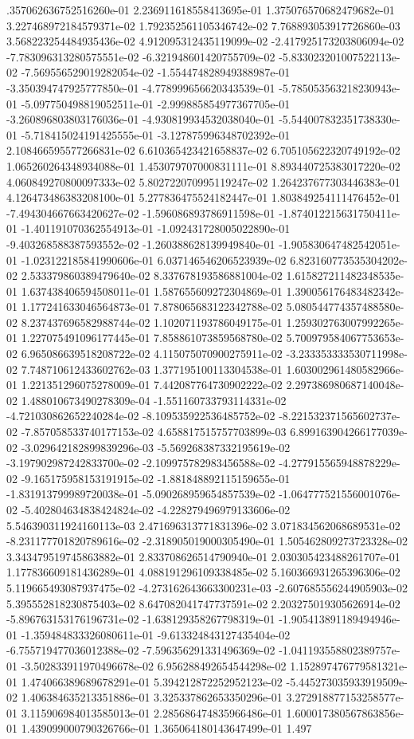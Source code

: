 .357062636752516260e-01	2.236911618558413695e-01	1.375076570682479682e-01	3.227468972184579371e-02	1.792352561105346742e-02	7.768893053917726860e-03	3.568223254484935436e-02	4.912095312435119099e-02	-2.417925173203806094e-02	-7.783096313280575551e-02	-6.321948601420755709e-02	-5.833023201007522113e-02	-7.569556529019282054e-02	-1.554474828949388987e-01	-3.350394747925777850e-01	-4.778999656620343539e-01	-5.785053563218230943e-01	-5.097750498819052511e-01	-2.999885854977367705e-01	-3.260896803803176036e-01	-4.930819934532038040e-01	-5.544007832351738330e-01	-5.718415024191425555e-01	-3.127875996348702392e-01	2.108466595577266831e-02	6.610365423421658837e-02	6.705105622320749192e-02	1.065260264348934088e-01	1.453079707000831111e-01	8.893440725383017220e-02	4.060849270800097333e-02	5.802722070995119247e-02	1.264237677303446383e-01	4.126473486383208100e-01	5.277836475524182447e-01	1.803849254111476452e-01	-7.494304667663420627e-02	-1.596086893786911598e-01	-1.874012215631750411e-01	-1.401191070362554913e-01	-1.092431728005022890e-01	-9.403268588387593552e-02	-1.260388628139949840e-01	-1.905830647482542051e-01	-1.023122185841990606e-01	6.037146546206523939e-02	6.823160773535304202e-02	2.533379860389479640e-02	8.337678193586881004e-02	1.615827211482348535e-01	1.637438406594508011e-01	1.587655609272304869e-01	1.390056176483482342e-01	1.177241633046564873e-01	7.878065683122342788e-02	5.080544774357488580e-02	8.237437696582988744e-02	1.102071193786049175e-01	1.259302763007992265e-01	1.227075491096177445e-01	7.858861073859568780e-02	5.700979584067753653e-02	6.965086639518208722e-02	4.115075070900275911e-02	-3.233353333530711998e-02	7.748710612433602762e-03	1.377195100113304538e-01	1.603002961480582966e-01	1.221351296075278009e-01	7.442087764730902222e-02	2.297386980687140048e-02	1.488010673490278309e-04	-1.551160733793114331e-02	-4.721030862652240284e-02	-8.109535922536485752e-02	-8.221532371565602737e-02	-7.857058533740177153e-02	4.658817515757703899e-03	6.899163904266177039e-02	-3.029642182899839296e-03	-5.569268387332195619e-02	-3.197902987242833700e-02	-2.109975782983456588e-02	-4.277915565948878229e-02	-9.165175958153191915e-02	-1.881848892115159655e-01	-1.831913799989720038e-01	-5.090268959654857539e-02	-1.064777521556001076e-02	-5.402804634838424824e-02	-4.228279496979133606e-02	5.546390311924160113e-03	2.471696313771831396e-02	3.071834562068689531e-02	-8.231177701820789616e-02	-2.318905019000305490e-01	1.505462809273723328e-02	3.343479519745863882e-01	2.833708626514790940e-01	2.030305423488261707e-01	1.177836609181436289e-01	4.088191296109338485e-02	5.160366931265396306e-02	5.119665493087937475e-02	-4.273162643663300231e-03	-2.607685556244905903e-02	5.395552818230875403e-02	8.647082041747737591e-02	2.203275019305626914e-02	-5.896763153176196731e-02	-1.638129358267798319e-01	-1.905413891189494946e-01	-1.359484833326080611e-01	-9.613324843127435404e-02	-6.755719477036012388e-02	-7.596356291331496369e-02	-1.041193558802389757e-01	-3.502833911970496678e-02	6.956288492654544298e-02	1.152897476779581321e-01	1.474066389689678291e-01	5.394212872252952123e-02	-5.445273035933919509e-02	1.406384635213351886e-01	3.325337862653350296e-01	3.272918877153258577e-01	3.115906984013585013e-01	2.285686474835966486e-01	1.600017380567863856e-01	1.439099000790326766e-01	1.365064180143647499e-01	1.497